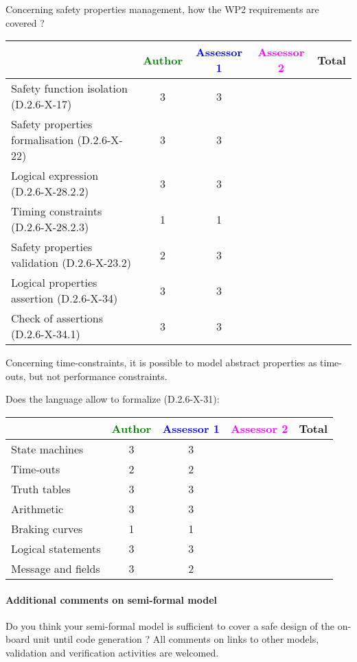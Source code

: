 Concerning safety properties management, how the WP2 requirements are covered ?

\begin{tabular}{|l | c | c | c | c|}
\hline
& \textcolor{green}{Author} & \textcolor{blue}{Assessor 1} & \textcolor{magenta}{Assessor 2} & Total \\
\hline 
Safety function isolation (D.2.6-X-17)  & 3 & 3 & &  \\
\hline 
Safety properties formalisation (D.2.6-X-22)  & 3 & 3 & &  \\
\hline
Logical expression (D.2.6-X-28.2.2)  & 3 & 3 & &  \\
\hline
Timing constraints (D.2.6-X-28.2.3)  & 1 & 1 & &  \\
\hline
Safety properties validation (D.2.6-X-23.2)  & 2 & 3 & &  \\
\hline
Logical properties assertion (D.2.6-X-34)  & 3 & 3 & &  \\
\hline
Check  of assertions (D.2.6-X-34.1)  & 3 & 3 & &  \\
\hline
\end{tabular}


\begin{author_comment}
Concerning time-constraints, it is possible to  model  abstract properties as time-outs, but not performance constraints.
\end{author_comment}


Does the language allow to  formalize (D.2.6-X-31):

\begin{tabular}{|l | c | c | c | c|}
\hline
& \textcolor{green}{Author} & \textcolor{blue}{Assessor 1} & \textcolor{magenta}{Assessor 2} & Total \\
\hline 
State machines  & 3 & 3 & &  \\
\hline
Time-outs  & 2 & 2 & &  \\
\hline
Truth tables  & 3 & 3 & &  \\
\hline
Arithmetic  & 3 & 3 & &  \\
\hline
Braking curves  & 1 & 1 & &  \\
\hline
Logical statements & 3 & 3 & &  \\
\hline
Message and fields & 3 & 2 & &  \\
\hline
\end{tabular}

\paragraph{Additional comments on semi-formal  model} Do you think your semi-formal  model is sufficient to cover a safe design of the on-board unit until code generation ?
All comments on links to  other models, validation and verification activities are welcomed.


